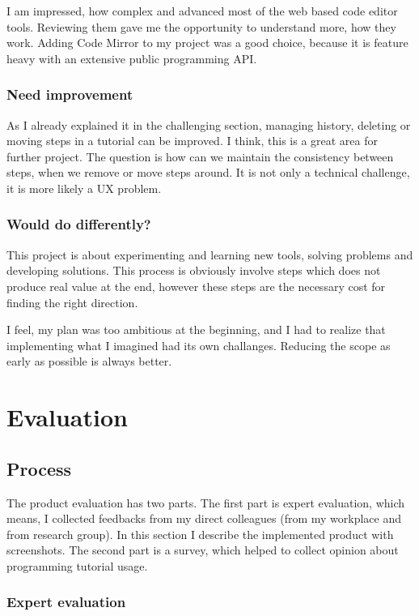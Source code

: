 \documentclass[12pt, a4paper, oneside, openright, medskipamount]{report}
\begin{document}
I am impressed, how complex and advanced most of the web based code editor tools. Reviewing them gave me the opportunity to understand more, how they work. Adding Code Mirror to my project was a good choice, because it is feature heavy with an extensive public programming API.

\subsection {Need improvement}

As I already explained it in the challenging section, managing history, deleting or moving steps in a tutorial can be improved. I think, this is a great area for further project. The question is how can we maintain the consistency between steps, when we remove or move steps around. It is not only a technical challenge, it is more likely a UX problem.

\subsection {Would do differently?}

This project is about experimenting and learning new tools, solving problems and developing solutions. This process is obviously involve steps which does not produce real value at the end, however these steps are the necessary cost for finding the right direction.

I feel, my plan was too ambitious at the beginning, and I had to realize that implementing what I imagined had its own challanges. Reducing the scope as early as possible is always better.

\chapter{Evaluation}

\section{Process}

The product evaluation has two parts. The first part is expert evaluation, which means, I collected feedbacks from my direct colleagues (from my workplace and from research group). In this section I describe the implemented product with screenshots. The second part is a survey, which helped to collect opinion about programming tutorial usage.

\subsection{Expert evaluation}
\end{document}
